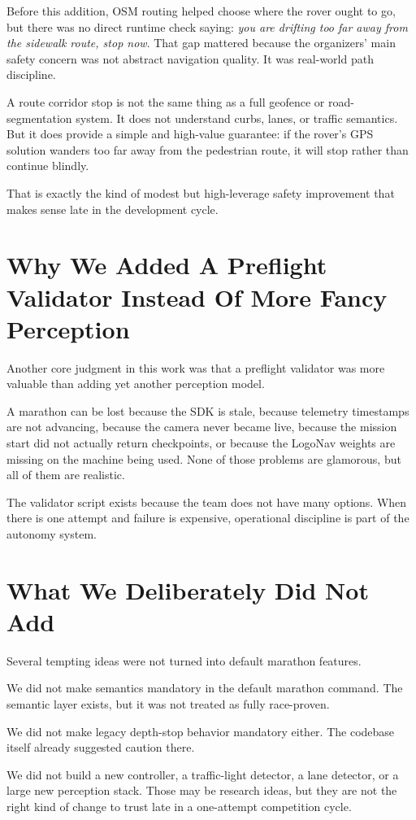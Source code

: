 \documentclass[11pt]{article}
\begin{document}
Before this addition, OSM routing helped choose where the rover ought to go, but there was no direct runtime check saying: \emph{you are drifting too far away from the sidewalk route, stop now}. That gap mattered because the organizers' main safety concern was not abstract navigation quality. It was real-world path discipline.

A route corridor stop is not the same thing as a full geofence or road-segmentation system. It does not understand curbs, lanes, or traffic semantics. But it does provide a simple and high-value guarantee: if the rover's GPS solution wanders too far away from the pedestrian route, it will stop rather than continue blindly.

That is exactly the kind of modest but high-leverage safety improvement that makes sense late in the development cycle.

\section{Why We Added A Preflight Validator Instead Of More Fancy Perception}
Another core judgment in this work was that a preflight validator was more valuable than adding yet another perception model.

A marathon can be lost because the SDK is stale, because telemetry timestamps are not advancing, because the camera never became live, because the mission start did not actually return checkpoints, or because the LogoNav weights are missing on the machine being used. None of those problems are glamorous, but all of them are realistic.

The validator script exists because the team does not have many options. When there is one attempt and failure is expensive, operational discipline is part of the autonomy system.

\section{What We Deliberately Did Not Add}
Several tempting ideas were not turned into default marathon features.

We did not make semantics mandatory in the default marathon command. The semantic layer exists, but it was not treated as fully race-proven.

We did not make legacy depth-stop behavior mandatory either. The codebase itself already suggested caution there.

We did not build a new controller, a traffic-light detector, a lane detector, or a large new perception stack. Those may be research ideas, but they are not the right kind of change to trust late in a one-attempt competition cycle.
\end{document}
